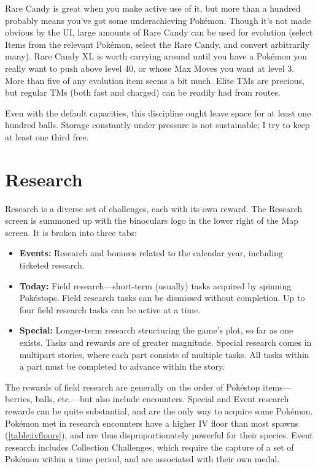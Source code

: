 Rare Candy is great when you make active use of it, but more than a hundred
  probably means you've got some underachieving Pokémon.
Though it's not made obvious by the UI, large amounts of Rare Candy can be
  used for evolution (select Items from the relevant Pokémon, select
  the Rare Candy, and convert arbitrarily many).
Rare Candy XL is worth carrying around until you have a Pokémon you really
  want to push above level 40, or whose Max Moves you want at level 3.
More than five of any evolution item seems a bit much.
Elite TMs are precious, but regular TMs (both fast and charged) can be readily
  had from routes.

Even with the default capacities, this discipline ought leave space for at least one hundred balls.
Storage constantly under pressure is not sustainable; I try to keep at least one third free.

\section{Research\label{sec:research}}
Research is a diverse set of challenges, each with its own reward.
The Research screen is summoned up with the binoculars logo in the lower right of the Map screen.
It is broken into three tabs:
\begin{itemize}
  \item \textbf{Events:} Research and bonuses related to the calendar year, including ticketed research.
  \item \textbf{Today:} Field research---short-term (usually) tasks acquired by spinning Pokéstops.
            Field research tasks can be dismissed without completion.
            Up to four field research tasks can be active at a time.
  \item \textbf{Special:} Longer-term research structuring the game's plot, so far as one exists.
    Tasks and rewards are of greater magnitude.
    Special research comes in multipart stories, where each part consists of multiple tasks.
    All tasks within a part must be completed to advance within the story.
\end{itemize}
The rewards of field research are generally on the order of Pokéstop items---berries, balls,
 etc.---but also include encounters.
Special and Event research rewards can be quite substantial, and are the only way to acquire some Pokémon.
Pokémon met in research encounters have a higher IV floor than most spawns (\autoref{table:ivfloors}),
  and are thus disproportionately powerful for their species.
Event research includes Collection Challenges, which require the capture of a set of Pokémon
  within a time period, and are associated with their own medal.

